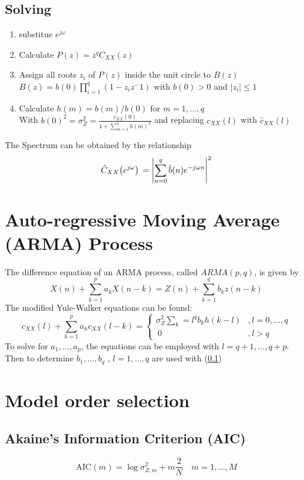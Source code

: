 \documentclass[accentcolor=tud4c,9.5pt,nochapname,bigchapter,paper=a5report]{tudreport}
\begin{document}
\subsection{Solving} \label{solv}
\begin{enumerate}
  \item substitue $e^{j\omega}$
  \item Calculate $P(z)=z^qC_{XX}(z)$
  \item Assign all roots $z_i$ of $P(z)$ inside the unit circle to $B(z)$ \\
  		$B(z)=b(0)\prod_{i=1}^q(1-z_iz^-1)$ with $b(0)>0$ and $|z_i|\leq 1$
  \item Calculate $h(m)=b(m)/b(0)$ for $m=1,\ldots,q$\\ 
		With $b(0)^2=\sigma_Z^2=\frac{c_{XX}(0)}{1+\sum_{m=1}^q h(m)^2}$ and replacing $c_{XX}(l)$ with $\hat{c}_{XX}(l)$ 
\end{enumerate}
The Spectrum can be obtained by the relationship
\begin{equation}
\hat{C}_{XX}{\left(e^{j\omega}\right)}\, = \left|\sum\limits_{n=0}^q \hat{b}(n)e^{-j\omega n} \right|^2
\end{equation}

\section{Auto-regressive Moving Average (ARMA) Process}
The difference equation of an ARMA process, called $ARMA(p,q)$, is given by
\begin{equation}
X(n)+\sum\limits_{k=1}^p a_kX(n-k) = Z(n)+\sum\limits_{k=1}^q b_kz(n-k)
\end{equation}
The modified Yule-Walker equations can be found:
\begin{equation}
c_{XX}(l)+\sum\limits_{k=1}^p a_k c_{XX}(l-k) = \begin{cases}
\sigma_Z^2\sum_k=l^q b_kh(k-l) &,l=0,\ldots,q\\\
0&,l>q
\end{cases}
\end{equation}
To solve for $a_1,\ldots,a_p$, the equations can be employed with $l=q+1,\ldots,q+p$. Then to determine $b_1,\ldots,b_q$ , $l=1,\ldots,q$ are used with (\ref{solv})

\section{Model order selection}
\subsection{Akaine's Information Criterion (AIC)}
\begin{equation}
\text{AIC}(m)=\log \sigma_{Z,m}^2 + m\frac{2}{N} \quad m=1,\ldots,M
\end{equation}
\end{document}
